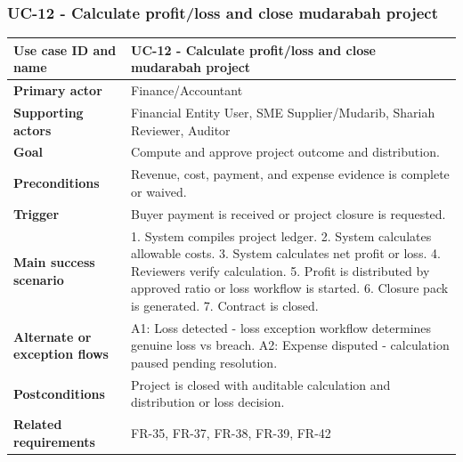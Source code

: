 \documentclass[11pt,a4paper]{article}
\begin{document}
\subsubsection{UC-12 - Calculate profit/loss and close mudarabah project}
\begin{footnotesize}
\begin{longtable}{@{}p{}p{}@{}}
\rowcolor{gray!10}\textbf{Use case ID and name} & UC-12 - Calculate profit/loss and close mudarabah project \\ \hline
\rowcolor{gray!10}\textbf{Primary actor} & Finance/Accountant \\ \hline
\rowcolor{gray!10}\textbf{Supporting actors} & Financial Entity User, SME Supplier/Mudarib, Shariah Reviewer, Auditor \\ \hline
\rowcolor{gray!10}\textbf{Goal} & Compute and approve project outcome and distribution. \\ \hline
\rowcolor{gray!10}\textbf{Preconditions} & Revenue, cost, payment, and expense evidence is complete or waived. \\ \hline
\rowcolor{gray!10}\textbf{Trigger} & Buyer payment is received or project closure is requested. \\ \hline
\rowcolor{gray!10}\textbf{Main success scenario} & 1. System compiles project ledger. 2. System calculates allowable costs. 3. System calculates net profit or loss. 4. Reviewers verify calculation. 5. Profit is distributed by approved ratio or loss workflow is started. 6. Closure pack is generated. 7. Contract is closed. \\ \hline
\rowcolor{gray!10}\textbf{Alternate or exception flows} & A1: Loss detected - loss exception workflow determines genuine loss vs breach. A2: Expense disputed - calculation paused pending resolution. \\ \hline
\rowcolor{gray!10}\textbf{Postconditions} & Project is closed with auditable calculation and distribution or loss decision. \\ \hline
\rowcolor{gray!10}\textbf{Related requirements} & FR-35, FR-37, FR-38, FR-39, FR-42 \\ \hline
\end{longtable}
\end{footnotesize}
\end{document}
